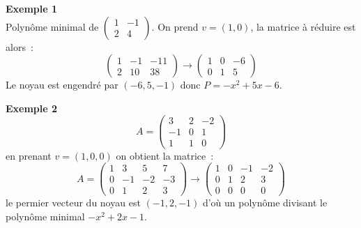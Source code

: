 \documentclass[a4paper,11pt]{article}
\begin{document}
\begin{giacjshere}
{\bf Exemple 1}\\
Polynôme minimal de $\left(\begin{array}{cc} 1 & -1 \\ 2 & 4
\end{array}\right) $. On prend $v=(1,0)$, la matrice à réduire est
alors~:
\[ \left(\begin{array}{ccc} 1 & -1 & -11 \\ 2 & 10 & 38
\end{array}\right) \rightarrow 
\left(\begin{array}{ccc} 1 & 0 & -6 \\ 0 & 1 & 5
\end{array}\right)
\]
Le noyau est engendré par $(-6,5,-1)$ donc $P=-x^2+5x-6$.

{\bf Exemple 2}\\
\[ A=\left(\begin{array}{ccc}
 3 & 2 & -2 \\
-1 &0 &1 \\
1 & 1 & 0 
\end{array}\right) \]
en prenant $v=(1,0,0)$ on obtient la matrice~:
\[ A=\left(\begin{array}{cccc}
1 & 3 & 5 & 7 \\
0 & -1 & -2 & -3 \\
0 & 1 & 2 & 3
\end{array}\right) \rightarrow
\left(\begin{array}{cccc}
1 & 0 & -1 & -2 \\
0 & 1 & 2 & 3 \\
0 & 0 & 0 & 0 
\end{array}\right) \]
le permier vecteur du noyau est $(-1,2,-1)$ d'où un polynôme divisant
le polynôme minimal $-x^2+2x-1$.


\end{giacjshere}
\end{document}
